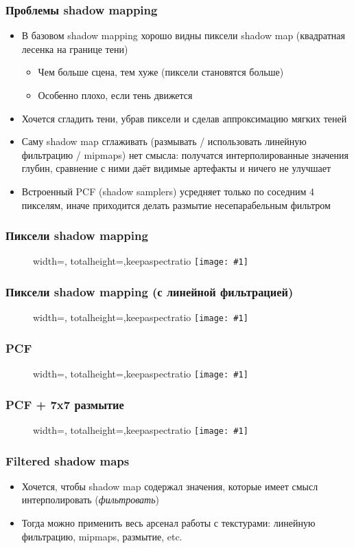 \documentclass{beamer}
\newcommand{\slideimage}[1]{
  \begin{figure}
    \begin{adjustbox}{width=\textwidth, totalheight=\textheight-2\baselineskip-2\baselineskip,keepaspectratio}
      \texttt{[image: \#1]}
    \end{adjustbox}
  \end{figure}
}
\begin{document}
\begin{frame}[fragile]
\frametitle{Проблемы shadow mapping}
\begin{itemize}
\item В базовом shadow mapping хорошо видны пиксели shadow map (квадратная лесенка на границе тени)
\pause
\begin{itemize}
\item Чем больше сцена, тем хуже (пиксели становятся больше)
\pause
\item Особенно плохо, если тень движется
\end{itemize}
\pause
\item Хочется сгладить тени, убрав пиксели и сделав аппроксимацию мягких теней
\pause
\item Саму shadow map сглаживать (размывать / использовать линейную фильтрацию / mipmaps) нет смысла: получатся интерполированные значения глубин, сравнение с ними даёт видимые артефакты и ничего не улучшает
\pause
\item Встроенный PCF (shadow samplers) усредняет только по соседним 4 пикселям, иначе приходится делать размытие несепарабельным фильтром
\end{itemize}
\end{frame}

\begin{frame}[fragile]
\frametitle{Пиксели shadow mapping}
\slideimage{shadow_map_nearest.png}
\end{frame}

\begin{frame}[fragile]
\frametitle{Пиксели shadow mapping (с линейной фильтрацией)}
\slideimage{shadow_map_linear.png}
\end{frame}

\begin{frame}[fragile]
\frametitle{PCF}
\slideimage{pcf.png}
\end{frame}

\begin{frame}[fragile]
\frametitle{PCF + 7x7 размытие}
\slideimage{pcf_gauss.png}
\end{frame}

\begin{frame}[fragile]
\frametitle{Filtered shadow maps}
\begin{itemize}
\item Хочется, чтобы shadow map содержал значения, которые имеет смысл интерполировать (\textit{фильтровать})
\pause
\item Тогда можно применить весь арсенал работы с текстурами: линейную фильтрацию, mipmaps, размытие, etc.
\end{itemize}
\end{frame}
\end{document}
